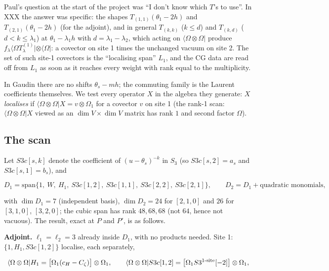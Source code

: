 \documentclass[11pt]{article}
\begin{document}
Paul's question at the start of the project was ``I don't know which $T$'s to use''. In XXX the answer was specific: the shapes $T_{(1,1)}(\theta_1-2h)$ and $T_{(2,1)}(\theta_1-2h)$ (for the adjoint), and in general $T_{(k,k)}$ ($k\le d$) and $T_{(k,d)}$ ($d<k\le\lambda_1$) at $\theta_1-\lambda_1h$ with $d=\lambda_1-\lambda_2$, which acting on $\langle\Omega\otimes\Omega|$ produce $f_\lambda\langle\Omega T^{(1)}_\lambda|\otimes\langle\Omega|$: a covector on site 1 times the unchanged vacuum on site 2.
The set of such site-1 covectors is the ``localising span'' $L_1$, and the CG data are read off from $L_1$ as soon as it reaches every weight with rank equal to the multiplicity.

In Gaudin there are no shifts $\theta_s-mh$; the commuting family is the Laurent coefficients themselves.
We test every operator $X$ in the algebra they generate: $X$ \emph{localises} if $\langle\Omega\otimes\Omega|X=v\otimes\Omega_1$ for a covector $v$ on site 1 (the rank-1 scan: $\langle\Omega\otimes\Omega|X$ viewed as an $\dim V\times\dim V$ matrix has rank $1$ and second factor $\Omega$).

\subsection{The scan}\label{sec:scan}

Let $S3c[s,k]$ denote the coefficient of $(u-\theta_s)^{-k}$ in $S_3$ (so $S3c[s,2]=a_s$ and $S3c[s,1]=b_s$), and

\begin{equation}
D_1=\mathrm{span}\{1,\ W,\ H_1,\ S3c[1,2],\ S3c[1,1],\ S3c[2,2],\ S3c[2,1]\},\qquad D_2=D_1+\text{quadratic monomials},\label{eq:D12}
\end{equation}

with $\dim D_1=7$ (independent basis), $\dim D_2=24$ for $[2,1,0]$ and $26$ for $[3,1,0]$, $[3,2,0]$; the cubic span has rank $48,68,68$ (not $64$, hence not vacuous).
The result, exact at $P$ and $P'$, is as follows.

\textbf{Adjoint.} $\ell_1=\ell_2=3$ already inside $D_1$, with no products needed.
Site 1: $\{1,H_1,S3c[1,2]\}$ localise, each separately,

\begin{equation}
\langle\Omega\otimes\Omega|H_1=\bigl[\Omega_1(c_H-C_\zeta)\bigr]\otimes\Omega_1,\qquad \langle\Omega\otimes\Omega|S3c[1,2]=\bigl[\Omega_1S3^{\rm 1\text{-}site}[-2]\bigr]\otimes\Omega_1,\label{eq:localise}
\end{equation}
\end{document}
